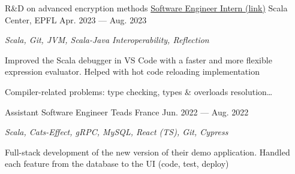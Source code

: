 \begin{MainPart}
{    \vspace{0.5\baselineskip}
    R\&D on advanced encryption methods
  }
  \Experience%
  {\href{https://github.com/scalacenter/scala-debug-adapter/pulls?q=is\%3Apr+author\%3Aiusildra+}{Software Engineer Intern (link)}}
  {Scala Center, EPFL}
  {Apr. 2023 --- Aug. 2023}
  {
    \textit{Scala, Git, JVM, Scala-Java Interoperability, Reflection}
    \begin{ItemList}{\ColorHighlight}
      \item[\ding{226}] Improved the Scala debugger in VS Code with a faster and more flexible expression evaluator. Helped with hot code reloading implementation
      \item[\ding{226}] Compiler-related problems: type checking, types \& overloads resolution\dots
    \end{ItemList}
  }
  \Experience%
  {Assistant Software Engineer}
  {Teads France}
  {Jun. 2022 --- Aug. 2022}
  {
    \textit{Scala, Cats-Effect, gRPC, MySQL, React (TS), Git, Cypress}

    \vspace{0.5\baselineskip}
    Full-stack development of the new version of their demo application. Handled each feature from the database to the UI (code, test, deploy)
  }
\end{MainPart}